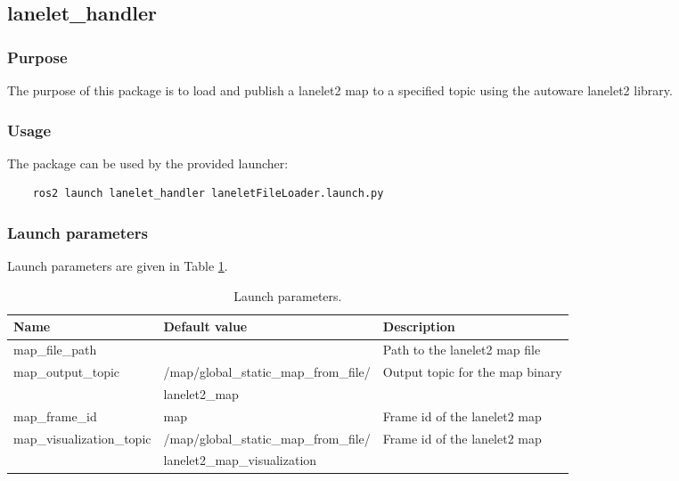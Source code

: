 \documentclass[sn-mathphys-num]{sn-jnl}%
\begin{document}
\subsection{lanelet\_handler}
\subsubsection{Purpose}
The purpose of this package is to load and publish a lanelet2 map to a specified topic using the autoware lanelet2 library.
\subsubsection{Usage}
The package can be used by the provided launcher:
\begin{lstlisting}
    ros2 launch lanelet_handler laneletFileLoader.launch.py
\end{lstlisting}
\subsubsection{Launch parameters}
Launch parameters are given in Table \ref{tab:lanelet_handler}.
\begin{table}[!h]
    \centering
    \captionsetup{justification=centering}
    \normalsize
    \caption{\label{tab:lanelet_handler} Launch parameters.}
    \begin{tabular}{| l | l | l |}
        \hline
        \textbf{Name} & \textbf{Default value} & \textbf{Description} \\
        \hline
        map\_file\_path           &                                       & Path to the lanelet2 map file \\
        \hline
        map\_output\_topic        & /map/global\_static\_map\_from\_file/ & Output topic for the map binary \\
                                  & lanelet2\_map                         &  \\
        \hline
        map\_frame\_id            & map                                   & Frame id of the lanelet2 map \\
        \hline
        map\_visualization\_topic & /map/global\_static\_map\_from\_file/ & Frame id of the lanelet2 map \\
                                  & lanelet2\_map\_visualization          &  \\
        \hline
    \end{tabular}
\end{table}
\end{document}
